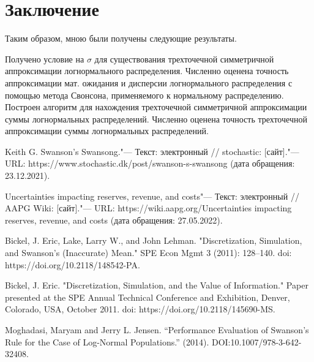 \documentclass[12pt]{article}
\begin{document}
	\clearpage
	\section{Заключение}
	
	Таким образом, мною были получены следующие результаты. 
	
	Получено условие на $\sigma$ для существования трехточечной симметричной аппроксимации логнормального распределения.
	Численно оценена точность аппроксимации мат. ожидания и дисперсии логнормального распределения с помощью метода Свонсона, применяемого к нормальному распределению.
	Построен алгоритм для нахождения трехточечной симметричной аппроксимации суммы логнормальных распределений.
	Численно оценена точность трехточечной аппроксимации суммы логнормальных распределений.
	
	\begin{thebibliography}{1}
		 Keith G. Swanson's Swansong."--- Текст: электронный // stochastic: [сайт]."--- URL: https://www.stochastic.dk/post/swanson-s-swansong (дата обращения: 23.12.2021).
		
		 Uncertainties impacting reserves, revenue, and costs"--- Текст: электронный // AAPG Wiki: [сайт]."--- URL: https://wiki.aapg.org/Uncertainties impacting reserves, revenue, and costs (дата обращения: 27.05.2022).
		
		 Bickel, J. Eric, Lake, Larry W., and John Lehman. "Discretization, Simulation, and Swanson's (Inaccurate) Mean." SPE Econ Mgmt 3 (2011): 128–140. doi: https://doi.org/10.2118/148542-PA.
		
		 Bickel, J. Eric. "Discretization, Simulation, and the Value of Information." Paper presented at the SPE Annual Technical Conference and Exhibition, Denver, Colorado, USA, October 2011. doi: https://doi.org/10.2118/145690-MS.
		
		 Moghadasi, Maryam and Jerry L. Jensen. “Performance Evaluation of Swanson’s Rule for the Case of Log-Normal Populations.” (2014). DOI:10.1007/978-3-642-32408.
		
		
	\end{thebibliography}
	
	
	
	
	
\end{document}

